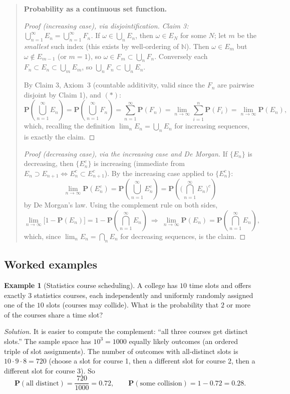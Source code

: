 \documentclass[11pt]{article}
\theoremstyle{definition}
\newtheorem{example}[definition]{Example}
\theoremstyle{plain}
\theoremstyle{remark}
\newenvironment{extra}[1][Supplementary Material (beyond the core syllabus)]{%
  \begin{quote}\color{red}\noindent\textbf{#1.}\par\smallskip
}{%
  \end{quote}
}
\newcommand{\N}{\mathbb{N}}
\begin{document}
\begin{extra}[Probability as a continuous set function]
\begin{proof}[Proof (increasing case), via disjointification]
\emph{Claim 3: $\bigcup_{n=1}^\infty E_n = \bigcup_{n=1}^\infty F_n$.} If $\omega \in
\bigcup_n E_n$, then $\omega \in E_N$ for some $N$; let $m$ be the \emph{smallest} such index (this
exists by well-ordering of $\N$). Then $\omega \in E_m$ but $\omega \notin E_{m-1}$ (or $m=1$), so
$\omega \in F_m \subset \bigcup_n F_n$. Conversely each $F_n \subset E_n \subset \bigcup_m E_m$, so
$\bigcup_n F_n \subset \bigcup_n E_n$.

By Claim 3, Axiom~3 (countable additivity, valid since the $F_n$ are pairwise disjoint by Claim 1),
and $(\ast)$:
\[
\mathbf{P}\left(\bigcup_{n=1}^\infty E_n\right) = \mathbf{P}\left(\bigcup_{n=1}^\infty F_n\right)
= \sum_{n=1}^\infty \mathbf{P}(F_n) = \lim_{n\to\infty}\sum_{i=1}^n \mathbf{P}(F_i)
= \lim_{n\to\infty}\mathbf{P}(E_n),
\]
which, recalling the definition $\lim_n E_n = \bigcup_n E_n$ for increasing sequences, is exactly
the claim.
\end{proof}

\begin{proof}[Proof (decreasing case), via the increasing case and De Morgan]
If $\{E_n\}$ is decreasing, then $\{E_n^c\}$ is increasing (immediate from $E_n \supset E_{n+1}
\iff E_n^c \subset E_{n+1}^c$). By the increasing case applied to $\{E_n^c\}$:
\[
\lim_{n\to\infty}\mathbf{P}(E_n^c) = \mathbf{P}\left(\bigcup_{n=1}^\infty E_n^c\right)
= \mathbf{P}\left(\Big(\bigcap_{n=1}^\infty E_n\Big)^{\!c}\right)
\]
by De Morgan's law. Using the complement rule on both sides,
\[
\lim_{n\to\infty}\big[1-\mathbf{P}(E_n)\big] = 1 - \mathbf{P}\left(\bigcap_{n=1}^\infty E_n\right)
\ \Longrightarrow\ \lim_{n\to\infty}\mathbf{P}(E_n) = \mathbf{P}\left(\bigcap_{n=1}^\infty E_n\right),
\]
which, since $\lim_n E_n = \bigcap_n E_n$ for decreasing sequences, is the claim.
\end{proof}
\end{extra}

\subsection{Worked examples}

\begin{example}[Statistics course scheduling]
A college has $10$ time slots and offers exactly $3$ statistics courses, each independently and
uniformly randomly assigned one of the $10$ slots (courses may collide). What is the probability
that $2$ or more of the courses share a time slot?

\emph{Solution.} It is easier to compute the complement: ``all three courses get distinct slots.''
The sample space has $10^3 = 1000$ equally likely outcomes (an ordered triple of slot assignments).
The number of outcomes with all-distinct slots is $10\cdot 9\cdot 8 = 720$ (choose a slot for
course 1, then a different slot for course 2, then a different slot for course 3). So
\[
\mathbf{P}(\text{all distinct}) = \frac{720}{1000} = 0.72, \qquad
\mathbf{P}(\text{some collision}) = 1-0.72 = \boxed{0.28}.
\]
\end{example}
\end{document}
